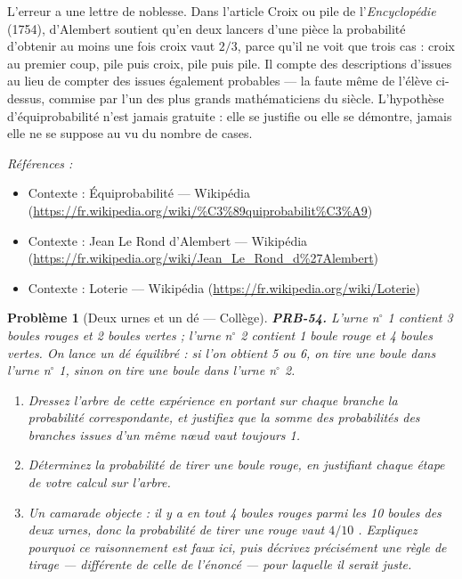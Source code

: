 \documentclass[11pt]{article}
\newtheorem{problem}{Problème}
\newenvironment{refs}{\par\small\noindent\emph{Références :}\begin{itemize}\setlength\itemsep{0pt}}{\end{itemize}\normalsize}
\begin{document}
\noindent L'erreur a une lettre de noblesse. Dans l'article \og{} Croix ou pile \fg{} de
l'\textit{Encyclopédie} (1754), d'Alembert soutient qu'en deux lancers d'une pièce la probabilité
d'obtenir au moins une fois croix vaut $ 2/3 $, parce qu'il ne voit que trois cas : croix au
premier coup, pile puis croix, pile puis pile. Il compte des descriptions d'issues au lieu de
compter des issues également probables --- la faute même de l'élève ci-dessus, commise par l'un des
plus grands mathématiciens du siècle. L'hypothèse d'équiprobabilité n'est jamais gratuite : elle se
justifie ou elle se démontre, jamais elle ne se suppose au vu du nombre de cases.

\begin{refs}
\item Contexte : Équiprobabilité --- Wikipédia (\url{https://fr.wikipedia.org/wiki/%C3%89quiprobabilit%C3%A9})
\item Contexte : Jean Le Rond d'Alembert --- Wikipédia (\url{https://fr.wikipedia.org/wiki/Jean_Le_Rond_d%27Alembert})
\item Contexte : Loterie --- Wikipédia (\url{https://fr.wikipedia.org/wiki/Loterie})
\end{refs}

\bigskip

\begin{problem}[{Deux urnes et un dé --- Collège}]
\textbf{PRB-54.} L'urne n$^\circ$ 1 contient 3 boules rouges et 2 boules vertes ; l'urne n$^\circ$ 2 contient
1 boule rouge et 4 boules vertes. On lance un dé équilibré : si l'on obtient 5 ou 6, on tire une
boule dans l'urne n$^\circ$ 1, sinon on tire une boule dans l'urne n$^\circ$ 2.
\begin{enumerate}
\item[(a)] Dressez l'arbre de cette expérience en portant sur chaque branche la probabilité
correspondante, et justifiez que la somme des probabilités des branches issues d'un même n\oe{}ud vaut
toujours 1.
\item[(b)] Déterminez la probabilité de tirer une boule rouge, en justifiant chaque étape de votre
calcul sur l'arbre.
\item[(c)] Un camarade objecte : \og{} il y a en tout 4 boules rouges parmi les 10 boules des deux urnes,
donc la probabilité de tirer une rouge vaut $ 4/10 $ \fg{}. Expliquez pourquoi ce raisonnement est
faux ici, puis décrivez précisément une règle de tirage --- différente de celle de l'énoncé --- pour
laquelle il serait juste.
\end{enumerate}

\end{problem}
\end{document}
